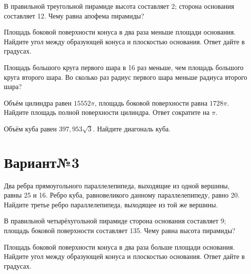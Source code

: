 \documentclass[4apaper]{article}
\begin{document}
\begin{taskBN}{2}
В правильной треугольной пирамиде высота составляет 2; сторона основания составляет 12. Чему равна апофема пирамиды?
\end{taskBN}

\begin{taskBN}{3}
Площадь боковой поверхности конуса в два раза меньше площади основания. Найдите угол между образующей конуса и плоскостью основания. Ответ дайте в градусах.
\end{taskBN}

\begin{taskBN}{4}
Площадь большого круга первого шара в 16 раз меньше, чем площадь большого круга второго шара. Во сколько раз радиус первого шара меньше радиуса второго шара?
\end{taskBN}

\begin{taskBN}{5}
Объём цилиндра равен $15552\pi$, площадь боковой поверхности равна $1728\pi$. Найдите площадь полной поверхности цилиндра. Ответ сократите на $\pi$.
\end{taskBN}

\begin{taskBN}{6}
Объём куба равен $397,953\sqrt{3}$. Найдите диагональ куба.
\end{taskBN}
\newpage\section*{Вариант№3}

\begin{taskBN}{1}
Два ребра прямоугольного параллелепипеда, выходящие из одной вершины, равны 25 и 16. Ребро куба, равновеликого данному параллелепипеду, равно 20. Найдите третье ребро параллелепипеда, выходящее из той же вершины.
\end{taskBN}

\begin{taskBN}{2}
В правильной четырёхугольной пирамиде сторона основания составляет 9; площадь боковой поверхности составляет 135. Чему равна высота пирамиды?
\end{taskBN}

\begin{taskBN}{3}
Площадь боковой поверхности конуса в два раза больше площади основания. Найдите угол между образующей конуса и плоскостью основания. Ответ дайте в градусах.
\end{taskBN}
\end{document}
